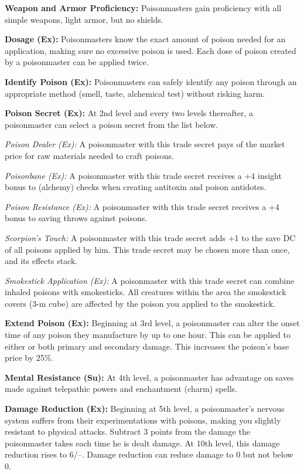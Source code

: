 {

\textbf{Weapon and Armor Proficiency:} Poisonmasters gain proficiency with all simple weapons, light armor, but no shields.


\textbf{Dosage (Ex):} Poisonmasters know the exact amount of poison needed for an application, making sure no excessive poison is used. Each dose of poison created by a poisonmaster can be applied twice.


\textbf{Identify Poison (Ex):} Poisonmasters can safely identify any poison through an appropriate method (smell, taste, alchemical test) without risking harm.


\textbf{Poison Secret (Ex):} At 2nd level and every two levels thereafter, a poisonmaster can select a poison secret from the list below.

\textit{Poison Dealer (Ex):} A poisonmaster with this trade secret pays \onehalf of the market price for raw materials needed to craft poisons.

\textit{Poisonbane (Ex):} A poisonmaster with this trade secret receives a +4 insight bonus to  (alchemy) checks when creating antitoxin and poison antidotes.

\textit{Poison Resistance (Ex):} A poisonmaster with this trade secret receives a +4 bonus to saving throws against poisons.

\textit{Scorpion's Touch:} A poisonmaster with this trade secret adds +1 to the save DC of all poisons applied by him. This trade secret may be chosen more than once, and its effects stack.

\textit{Smokestick Application (Ex):} A poisonmaster with this trade secret can combine inhaled poisons with smokesticks. All creatures within the area the smokestick covers (3-m cube) are affected by the poison you applied to the smokestick.




\textbf{Extend Poison (Ex):} Beginning at 3rd level, a poisonmaster can alter the onset time of any poison they manufacture by up to one hour. This can be applied to either or both primary and secondary damage. This increases the poison's base price by 25\%.


\textbf{Mental Resistance (Su):} At 4th level, a poisonmaster has advantage on saves made against telepathic powers and enchantment (charm) spells.


\textbf{Damage Reduction (Ex):} Beginning at 5th level, a poisonmaster's nervous system suffers from their experimentations with poisons, making you slightly resistant to physical attacks. Subtract 3 points from the damage the poisonmaster takes each time he is dealt damage. At 10th level, this damage reduction rises to 6/--. Damage reduction can reduce damage to 0 but not below 0.


}
